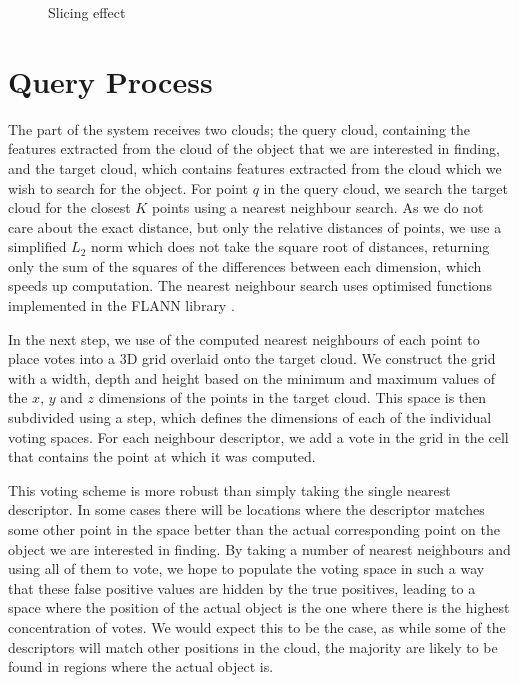 \documentclass[11pt,a4paper]{kth-mag}
\begin{document}
\begin{figure}
  \centering
  
  \caption{Slicing effect}
  \label{fig:slicing}
\end{figure}

\section{Query Process}

The part of the system receives two clouds; the query cloud, containing the
features extracted from the cloud of the object that we are interested in
finding, and the target cloud, which contains features extracted from the cloud
which we wish to search for the object. For point $q$ in the query cloud, we
search the target cloud for the closest $K$ points using a nearest neighbour
search. As we do not care about the exact distance, but only the relative
distances of points, we use a simplified $L_2$ norm which does not take the
square root of distances, returning only the sum of the squares of the
differences between each dimension, which speeds up computation. The nearest
neighbour search uses optimised functions implemented in the FLANN library
\cite{muja2009fast, muja2014scalable}.

In the next step, we use of the computed nearest neighbours of each point to
place votes into a 3D grid overlaid onto the target cloud. We construct the grid
with a width, depth and height based on the minimum and maximum values of the
$x$, $y$ and $z$ dimensions of the points in the target cloud. This space is
then subdivided using a step, which defines the dimensions of each of the
individual voting spaces. For each neighbour descriptor, we add a vote in the
grid in the cell that contains the point at which it was computed.

This voting scheme is more robust than simply taking the single nearest
descriptor. In some cases there will be locations where the descriptor matches
some other point in the space better than the actual corresponding point on the
object we are interested in finding. By taking a number of nearest neighbours
and using all of them to vote, we hope to populate the voting space in such a
way that these false positive values are hidden by the true positives, leading
to a space where the position of the actual object is the one where there is the
highest concentration of votes. We would expect this to be the case, as while
some of the descriptors will match other positions in the cloud, the majority
are likely to be found in regions where the actual object is.
\end{document}

